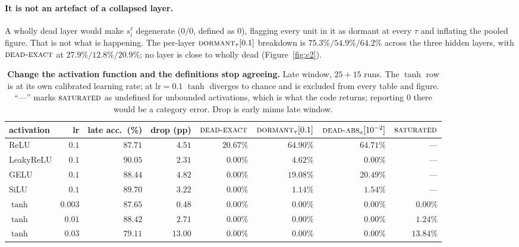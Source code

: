 \documentclass[10pt]{article}
\newcommand{\dexact}{\textsc{dead-exact}}
\newcommand{\ddorm}{\textsc{dormant}_\tau}
\newcommand{\dabs}{\textsc{dead-abs}_a}
\newcommand{\dsat}{\textsc{saturated}}
\begin{document}
\paragraph{It is not an artefact of a collapsed layer.}
A wholly dead layer would make $s^\ell_i$ degenerate ($0/0$, defined as $0$),
flagging every unit in it as dormant at every $\tau$ and inflating the pooled
figure. That is not what is happening. The per-layer $\ddorm[0.1]$ breakdown is
$75.3\% / 54.9\% / 64.2\%$ across the three hidden layers, with $\dexact$ at
$27.9\% / 12.8\% / 20.9\%$; no layer is close to wholly dead
(Figure~\ref{fig:c2}).

\begin{table}[t]
\centering
\caption{\textbf{Change the activation function and the definitions stop
agreeing.} Late window, $25 + 15$ runs. The $\tanh$ row is at its own calibrated
learning rate; at $\text{lr}=0.1$ $\tanh$ diverges to chance and is excluded
from every table and figure. ``---'' marks $\dsat$ as undefined for unbounded
activations, which is what the code returns; reporting $0$ there would be a
category error. Drop is early minus late window.}
\label{tab:acts}
\small
\begin{tabular}{@{}l r r r r r r r@{}}
\toprule
activation & lr & late acc.\ (\%) & drop (pp) & $\dexact$ & $\ddorm[0.1]$ & $\dabs[10^{-2}]$ & $\dsat$ \\
\midrule
ReLU        & $0.1$  & $87.71$ & $4.51$ & $20.67\%$ & $64.90\%$ & $64.71\%$ & --- \\
LeakyReLU   & $0.1$  & $90.05$ & $2.31$ & $\mathbf{0.00\%}$ & $4.62\%$ & $0.00\%$ & --- \\
GELU        & $0.1$  & $88.44$ & $\mathbf{4.82}$ & $\mathbf{0.00\%}$ & $19.08\%$ & $20.49\%$ & --- \\
SiLU        & $0.1$  & $89.70$ & $3.22$ & $\mathbf{0.00\%}$ & $1.14\%$ & $1.54\%$ & --- \\
\midrule
$\tanh$     & $0.003$ & $87.65$ & $0.48$ & $0.00\%$ & $0.00\%$ & $0.00\%$ & $0.00\%$ \\
$\tanh$     & $0.01$  & $88.42$ & $2.71$ & $0.00\%$ & $0.00\%$ & $0.00\%$ & $1.24\%$ \\
$\tanh$     & $\mathbf{0.03}$ & $\mathbf{79.11}$ & $\mathbf{13.00}$ &
$\mathbf{0.00\%}$ & $\mathbf{0.00\%}$ & $\mathbf{0.00\%}$ & $\mathbf{13.84\%}$ \\
\bottomrule
\end{tabular}
\end{table}
\end{document}
